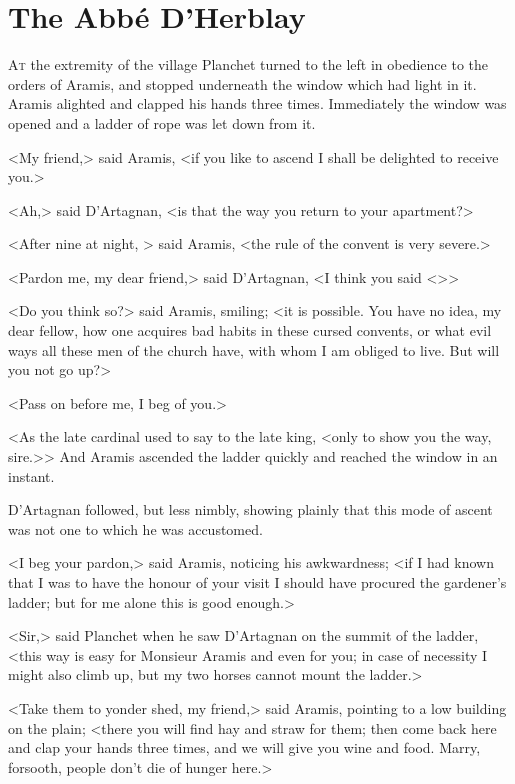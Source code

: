 \chapter{The Abbé D'Herblay}

 \lettrine{A}{t} the extremity of the village Planchet turned to the left in obedience to the orders of Aramis, and stopped underneath the window which had light in it. Aramis alighted and clapped his hands three times. Immediately the window was opened and a ladder of rope was let down from it.

<My friend,> said Aramis, <if you like to ascend I shall be delighted to receive you.>

<Ah,> said D'Artagnan, <is that the way you return to your apartment?>

<After nine at night, > said Aramis, <the rule of the convent is very severe.>

<Pardon me, my dear friend,> said D'Artagnan, <I think you said <>>

<Do you think so?> said Aramis, smiling; <it is possible. You have no idea, my dear fellow, how one acquires bad habits in these cursed convents, or what evil ways all these men of the church have, with whom I am obliged to live. But will you not go up?>

<Pass on before me, I beg of you.>

<As the late cardinal used to say to the late king, <only to show you the way, sire.>> And Aramis ascended the ladder quickly and reached the window in an instant.

D'Artagnan followed, but less nimbly, showing plainly that this mode of ascent was not one to which he was accustomed.

<I beg your pardon,> said Aramis, noticing his awkwardness; <if I had known that I was to have the honour of your visit I should have procured the gardener's ladder; but for me alone this is good enough.>

<Sir,> said Planchet when he saw D'Artagnan on the summit of the ladder, <this way is easy for Monsieur Aramis and even for you; in case of necessity I might also climb up, but my two horses cannot mount the ladder.>

<Take them to yonder shed, my friend,> said Aramis, pointing to a low building on the plain; <there you will find hay and straw for them; then come back here and clap your hands three times, and we will give you wine and food. Marry, forsooth, people don't die of hunger here.>


